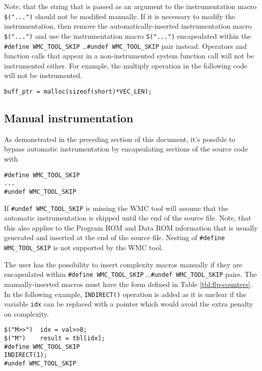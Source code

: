 Note, that the string that is passed as an argument to the instrumentation macro \verb|$("...")| should not be modified manually. If it is necessary to modify the instrumentation, then remove the automatically-inserted instrumentation macro \verb|$("...")| and use the instrumentation macro \verb|S("...")| encapsulated within the \verb|#define WMC_TOOL_SKIP| \ldots \verb|#undef WMC_TOOL_SKIP| pair instead. Operators and function calls that appear in a non-instrumented system function call will not be instrumented either. For example, the multiply operation in the following code will not be instrumented.

\begin{Verbatim}[fontsize=\small]
buff_ptr = malloc(sizeof(short)*VEC_LEN);
\end{Verbatim}

\subsection{Manual instrumentation}

As demonstrated in the preceding section of this document, it's possible to bypass automatic instrumentation by encapsulating sections of the source code with

\begin{Verbatim}[fontsize=\small]
#define WMC_TOOL_SKIP
...
#undef WMC_TOOL_SKIP
\end{Verbatim}

If \verb|#undef WMC_TOOL_SKIP| is missing the WMC tool will assume that the automatic instrumentation is skipped until the end of the source file. Note, that this also applies to the Program ROM and Data ROM information that is usually generated and inserted at the end of the source file. Nesting of \verb|#define WMC_TOOL_SKIP| is not supported by the WMC tool.

The user has the possibility to insert complexity macros manually if they are encapsulated within \verb|#define WMC_TOOL_SKIP| \ldots \verb|#undef WMC_TOOL_SKIP| pairs. The manually-inserted macros must have the form defined in Table \ref{tbl:flp-counters}. In the following example, \verb|INDIRECT()| operation is added as it is unclear if the variable \verb|idx| can be replaced with a pointer which would avoid the extra penalty on complexity.

\begin{Verbatim}[fontsize=\small]
$("M>>")  idx = val>>8;
$("M")    result = tbl[idx];
#define WMC_TOOL_SKIP
INDIRECT(1);
#undef WMC_TOOL_SKIP
\end{Verbatim}

